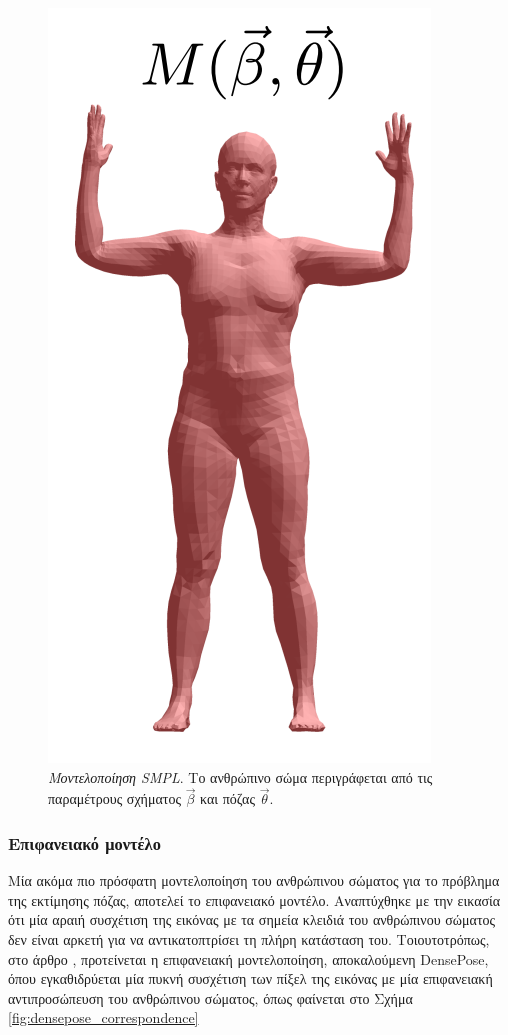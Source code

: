 \begin{figure}[h]
    \centering
    \includegraphics[scale=0.3]{images/chapter2/3d_pose_estimation/smpl_model.png}
    \caption[Μοντελοποίηση SMPL]{\textsl{Μοντελοποίηση SMPL}. Το ανθρώπινο σώμα περιγράφεται από τις παραμέτρους σχήματος $\vec{\beta}$ και πόζας $\vec{\theta}$.}
    \label{fig:smpl_model}
\end{figure}
    
\subsubsection{Επιφανειακό μοντέλο}
Μία ακόμα πιο πρόσφατη μοντελοποίηση του ανθρώπινου σώματος για το πρόβλημα της εκτίμησης πόζας, αποτελεί το επιφανειακό μοντέλο. Αναπτύχθηκε με την εικασία ότι μία αραιή συσχέτιση της εικόνας με τα σημεία κλειδιά του ανθρώπινου σώματος δεν είναι αρκετή για να αντικατοπτρίσει τη πλήρη κατάσταση του. Τοιουτοτρόπως, στο άρθρο \cite{densepose_paper}, προτείνεται η επιφανειακή μοντελοποίηση, αποκαλούμενη DensePose, όπου εγκαθιδρύεται μία πυκνή συσχέτιση των πίξελ της εικόνας με μία επιφανειακή αντιπροσώπευση του ανθρώπινου σώματος, όπως φαίνεται στο Σχήμα \ref{fig:densepose_correspondence} 

